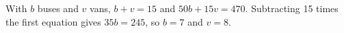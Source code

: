 With $ b $ buses and $ v $ vans, $ b+v=15 $ and $ 50b+15v=470 $. Subtracting 15 times the first equation gives $ 35b=245 $, so $ b=7 $ and $\boxed{v=8}$.
